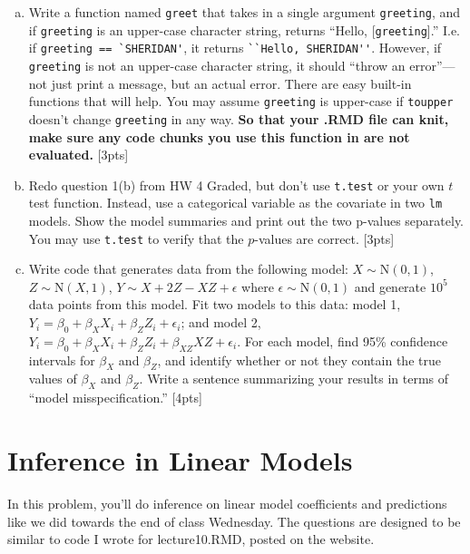 \documentclass[12pt]{article}
\newcommand{\Norm}{\text{N}}
\begin{document}
\begin{enumerate}[(a)]
	\item Write a function named \verb|greet| that takes in a single argument \verb|greeting|, and if \verb|greeting| is an upper-case character string, returns ``Hello, [\verb|greeting|].'' I.e. if \verb|greeting == `SHERIDAN'|, it returns \verb|``Hello, SHERIDAN''|. However, if \verb|greeting| is not an upper-case character string, it should ``throw an error''---not just print a message, but an actual error. There are easy built-in functions that will help. You may assume \verb|greeting| is upper-case if \verb|toupper| doesn't change \verb|greeting| in any way. \textbf{So that your .RMD file can knit, make sure any code chunks you use this function in are not evaluated.} [3pts]
	\item Redo question 1(b) from HW 4 Graded, but don't use \verb|t.test| or your own $t$ test function. Instead, use a categorical variable as the covariate in two \verb|lm| models. Show the model summaries and print out the two p-values separately. You may use \verb|t.test| to verify that the $p$-values are correct. [3pts]
	\item Write code that generates data from the following model: $X \sim \Norm(0,1)$, $Z \sim \Norm(X,1)$, $Y \sim X + 2Z - XZ + \epsilon$ where $\epsilon \sim \Norm(0,1)$ and generate $10^5$ data points from this model. Fit two models to this data: model 1, $Y_i = \beta_0 + \beta_X X_i + \beta_Z Z_i + \epsilon_i$; and model 2, $Y_i = \beta_0 + \beta_X X_i + \beta_Z Z_i + \beta_{XZ} XZ + \epsilon_i$. For each model, find 95\% confidence intervals for $\beta_X$ and $\beta_Z$, and identify whether or not they contain the true values of $\beta_X$ and $\beta_Z$. Write a sentence summarizing your results in terms of ``model misspecification.'' [4pts]
\end{enumerate}

\section{Inference in Linear Models}

In this problem, you'll do inference on linear model coefficients and predictions like we did towards the end of class Wednesday. The questions are designed to be similar to code I wrote for lecture10.RMD, posted on the website.
\end{document}
